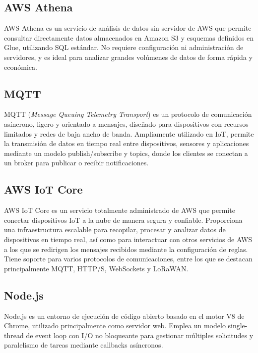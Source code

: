 \subsection{AWS Athena}

AWS Athena \citep{aws_athena} es un servicio de análisis de datos sin servidor de AWS que permite consultar directamente datos almacenados en Amazon S3 y esquemas definidos en Glue, utilizando SQL estándar. No requiere configuración ni administración de servidores, y es ideal para analizar grandes volúmenes de datos de forma rápida y económica.



\subsection{MQTT}

MQTT (\textit{Message Queuing Telemetry Transport}) \citep{mqtt_spec} es un protocolo de comunicación asíncrono, ligero y orientado a mensajes, diseñado para dispositivos con recursos limitados y redes de baja ancho de banda. Ampliamente utilizado en IoT, permite la transmisión de datos en tiempo real entre dispositivos, sensores y aplicaciones mediante un modelo publish/subscribe y topics, donde los clientes se conectan a un broker para publicar o recibir notificaciones.

\subsection{AWS IoT Core}

AWS IoT Core \citep{aws_iot_core} es un servicio totalmente administrado de AWS que permite conectar dispositivos IoT a la nube de manera segura y confiable. Proporciona una infraestructura escalable para recopilar, procesar y analizar datos de dispositivos en tiempo real, así como para interactuar con otros servicios de AWS a los que se redirigen los mensajes recibidos mediante la configuración de reglas. Tiene soporte para varios protocolos de comunicaciones, entre los que se destacan principalmente MQTT, HTTP/S, WebSockets y LoRaWAN.

\subsection{Node.js}

Node.js \citep{nodejs} es un entorno de ejecución de código abierto basado en el motor V8 de Chrome, utilizado principalmente como servidor web. Emplea un modelo single-thread de event loop con I/O no bloqueante para gestionar múltiples solicitudes y paralelismo de tareas mediante callbacks asíncronos.


